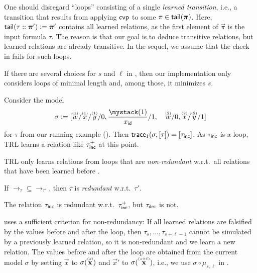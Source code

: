 \begin{remark}
  \label{remark:loops}
    One should disregard ``loops'' consisting of a single \emph{learned transition}, i.e., a transition that results from applying $\mathsf{cvp}$ to some $\pi \in \mathsf{tail}(\bm{\mathrm{\pi}})$.
    Here, $\mathsf{tail}(\tau\mathrel{::}\bm{\mathrm{\pi}}') \mathrel{\mathop:}= \bm{\mathrm{\pi}}'$ contains all learned relations, as the first element of $\vec{\pi}$ is the input formula $\tau$.
    The reason is that our goal is to deduce transitive relations, but learned relations are already transitive.
    In the sequel, we assume that the check in  fails for such loops.
\end{remark}
%
If there are several choices for $s$ and $\ell$ in , then our implementation only considers loops of minimal length and, among those, it minimizes $s$.
%
\begin{example}
  \label{ex:loops}
  Consider the model
  \[
    \sigma \Def [\ind{w}{1}/\ind{x}{1}/\ind{y}{1}/0, \ind[\id]{x}{1}/1, \quad \ind{w}{2}/0,\ind{x}{2}/\ind{y}{2}/1]
  \]
for $\tau$ from our running example ().
   Then $\mathsf{trace}_1(\sigma, [\tau]) = [\tau_{\mathsf{inc}}]$.
  As $\tau_{\mathsf{inc}}$ is a loop, TRL learns a relation like $\tau^+_{\mathsf{inc}}$ at this point.
\end{example}
%
TRL only learns relations from loops that are \emph{non-redundant} w.r.t.\ all relations that have been learned before \cite{adcl}.
%
\begin{definition}[Redundancy]
  \label{def:redundancy}
  If ${\to_\tau} \subseteq {\to_{\tau'}}$, then $\tau$ is \emph{redundant} w.r.t.\ $\tau'$.
\end{definition}
\begin{example}
  The relation $\tau_{\mathsf{inc}}$ is redundant w.r.t.\ $\tau^+_{\mathsf{inc}}$, but $\tau_{\mathsf{dec}}$ is not.
\end{example}
%
 uses a sufficient criterion for non-redundancy:
%
If all learned relations are falsified by the values before and after the loop, then
$\tau_s, \ldots, \tau_{s + \ell -1}$ cannot be simulated by a previously learned relation, so it is non-redundant and we learn a new relation.
%
The values before and after the loop are obtained from the current model $\sigma$ by
setting $\vec{x}$ to $\sigma(\ind{\vec{x}}{s})$ and $\vec{x}'$ to
$\sigma(\ind{\vec{x}}{s+\ell})$, i.e., we use $\sigma \circ \mu_{s,\ell}$ in
.


